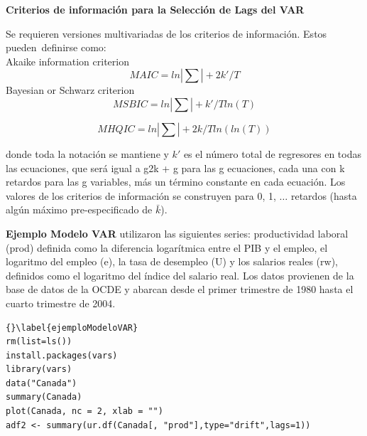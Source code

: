 	\textbf{Criterios de informaci\'on para la Selecci\'on de Lags del VAR}
	
	Se requieren versiones multivariadas de los criterios de informaci\'on. Estos pueden definirse como:\\
	Akaike information criterion
	\begin{equation*}
	MAIC = ln |\sum| + 2k'/T 
	\end{equation*}
	Bayesian or Schwarz criterion
	\begin{equation*}
	MSBIC = ln |\sum| + k'/T ln(T) 
	\end{equation*}
	
	\begin{equation*}
	MHQIC = ln |\sum| + 2k/T ln(ln(T))
	\end{equation*}
	
	donde toda la notaci\'on se mantiene y $k'$ es el n\'umero total de regresores en todas las ecuaciones, que ser\'a igual a g2k + g para las g ecuaciones, cada una con k retardos para las g variables, m\'as un t\'ermino constante en cada ecuaci\'on. Los valores de los criterios de informaci\'on se construyen para 0, 1, $\dots{}$ retardos (hasta alg\'un m\'aximo pre-especificado de $\bar{k}$).
	
\textbf{Ejemplo Modelo VAR}
	\cite{lutkepohl2004applied} utilizaron las siguientes series: productividad laboral (prod) definida como la diferencia logar\'{i}tmica entre el PIB y el empleo, el logaritmo del empleo (e), la tasa de desempleo (U) y los salarios reales (rw), definidos como el logaritmo del \'{i}ndice del salario real. Los datos provienen de la base de datos de la OCDE y abarcan desde el primer trimestre de 1980 hasta el cuarto trimestre de 2004.
	
%			
%			
\begin{lstlisting}[title={‘Código R: ejemplo Modelo VAR},basicstyle=\ttfamily]{}\label{ejemploModeloVAR}
rm(list=ls())
install.packages(vars)
library(vars)
data("Canada")
summary(Canada)
plot(Canada, nc = 2, xlab = "")
adf2 <- summary(ur.df(Canada[, "prod"],type="drift",lags=1))
\end{lstlisting}
	
